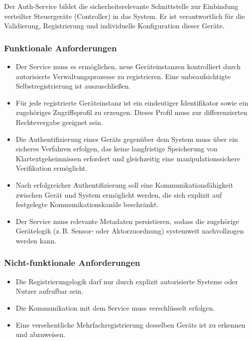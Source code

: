 Der Auth-Service bildet die sicherheitsrelevante Schnittstelle zur Einbindung verteilter Steuergeräte (Controller) in das System. Er ist verantwortlich für die Validierung, Registrierung und individuelle Konfiguration dieser Geräte.

\subsubsection{Funktionale Anforderungen}
\begin{itemize}
  \item Der Service muss es ermöglichen, neue Geräteinstanzen kontrolliert durch autorisierte Verwaltungsprozesse zu registrieren. Eine unbeaufsichtigte Selbstregistrierung ist auszuschließen.
  
  \item Für jede registrierte Geräteinstanz ist ein eindeutiger Identifikator sowie ein zugehöriges Zugriffsprofil zu erzeugen. Dieses Profil muss zur differenzierten Rechtevergabe geeignet sein.
  
  \item Die Authentifizierung eines Geräts gegenüber dem System muss über ein sicheres Verfahren erfolgen, das keine langfristige Speicherung von Klartextgeheimnissen erfordert und gleichzeitig eine manipulationssichere Verifikation ermöglicht.

  \item Nach erfolgreicher Authentifizierung soll eine Kommunikationsfähigkeit zwischen Gerät und System ermöglicht werden, die sich explizit auf festgelegte Kommunikationskanäle beschränkt.

  \item Der Service muss relevante Metadaten persistieren, sodass die zugehörige Gerätelogik (z.\,B. Sensor- oder Aktorzuordnung) systemweit nachvollzogen werden kann.
\end{itemize}

\subsubsection{Nicht-funktionale Anforderungen}
\begin{itemize}
  \item Die Registrierungslogik darf nur durch explizit autorisierte Systeme oder Nutzer aufrufbar sein.
  \item Die Kommunikation mit dem Service muss verschlüsselt erfolgen.
  \item Eine versehentliche Mehrfachregistrierung desselben Geräts ist zu erkennen und abzuweisen.
\end{itemize}

